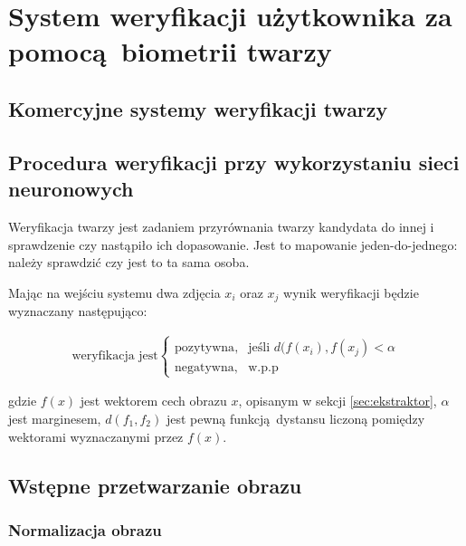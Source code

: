 

\section[verification]{System weryfikacji użytkownika za pomocą biometrii twarzy}

\subsection{Komercyjne systemy weryfikacji twarzy}

\subsection{Procedura weryfikacji przy wykorzystaniu sieci neuronowych} 

Weryfikacja twarzy jest zadaniem przyrównania twarzy kandydata 
do innej i sprawdzenie czy nastąpiło ich dopasowanie. Jest to mapowanie
jeden-do-jednego: należy sprawdzić czy jest to ta sama osoba.

Mając na wejściu systemu dwa zdjęcia \(x_i\) oraz \(x_j\) wynik weryfikacji będzie wyznaczany następująco:

\begin{align}\label{eq:ekstraktor_weryfikacja}
\text{weryfikacja jest}\begin{cases}
    \text{pozytywna},& \text{jeśli } d(f(x_i), f(x_j) < \alpha \\
    \text{negatywna},              & \text{w.p.p}
\end{cases}
\end{align}

gdzie \(f(x)\) jest wektorem cech obrazu \(x\), opisanym w sekcji
\ref{sec:ekstraktor}, \(\alpha\) jest marginesem, \(d(f_1, f_2)\) jest pewną funkcją dystansu liczoną pomiędzy wektorami wyznaczanymi przez \(f(x)\).

\subsection{Wstępne przetwarzanie obrazu}
\subsubsection{Normalizacja obrazu}

